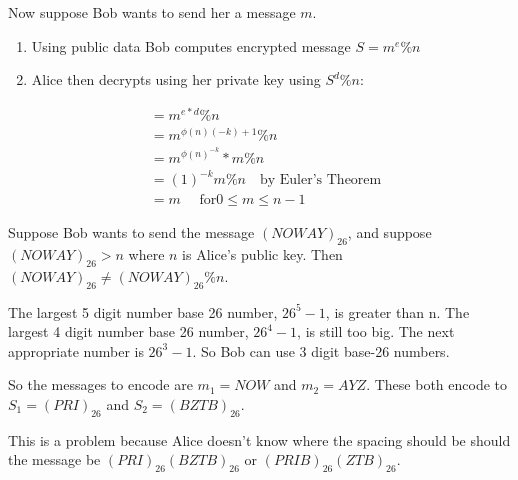  Now suppose Bob wants to send her a message $m$.
 
 \begin{enumerate}
 \item Using public data Bob computes encrypted message $ S = m^e \% n$
 \item Alice then decrypts using her private key using $S^d \% n $:
 \end{enumerate}

 \begin{align}
  &= m^{e*d} \% n \\
  &= m^{ \phi (n) (-k) + 1} \% n \\
  &= m^{ \phi (n)^{-k}} * m \% n \\
  &= (1)^{-k} m \% n  \quad \text{by Euler's Theorem} \\
  &= m \quad \text{ for} 0 \leq m \leq n -1
 \end{align}

 
 
 \begin{example}
 Suppose Bob wants to send the message $ (NOWAY)_{26}$, and suppose $ (NOWAY)_{26} > n$ where $n$ is Alice's public key. Then $(NOWAY)_{26} \neq  (NOWAY)_{26} \% n$.
 
 The largest 5 digit number base 26 number, $ 26^5 -1$, is greater than n. The largest 4 digit number base 26 number, $ 26^4 -1$, is still too big. The next appropriate number is $ 26^3 -1$. So Bob can use 3 digit base-26 numbers.
 
 So the messages to encode are $m_1 = NOW$ and $ m_2 = AYZ$. These both encode to $ S_1 = (PRI)_{26}$ and $ S_2 = (BZTB)_{26}$.
 
 This is a problem because Alice doesn't know where the spacing should be should the message be $(PRI)_{26} (BZTB)_{26}$ or $(PRIB)_{26} (ZTB)_{26}$. 
 
 
 
 \end{example}